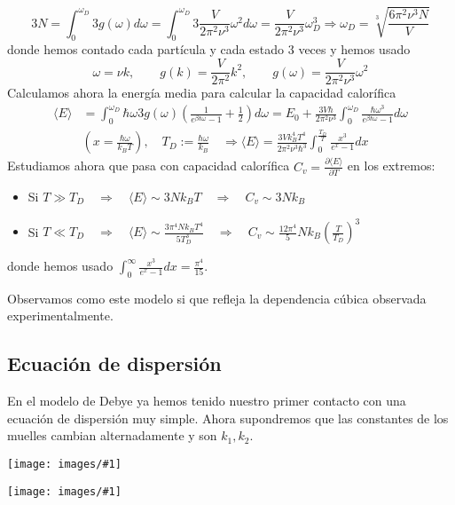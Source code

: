 \documentclass[leqno]{article}
\newcommand{\incimg}[1]{%
\center
\texttt{[image: images/\#1]}
}
\begin{document}
\[
  3N = \int_0^{\omega _D} 3g(\omega )d\omega =\int_0^{\omega _D}3 \frac{V}{2\pi^2\nu^3}\omega ^2 d\omega = \frac{V}{2\pi^2 \nu^3}\omega _D^3 \Rightarrow \boxed{\omega _D = \sqrt[3]{\frac{6\pi^2\nu^3N}{V}} }
\] 
donde hemos contado cada partícula y cada estado 3 veces y hemos usado
\[
\omega = \nu k, \qquad g(k)=\frac{V}{2\pi^2}k^2, \qquad g(\omega )= \frac{V}{2\pi^2 \nu^3}\omega ^2
\]
Calculamos ahora la energía media para calcular la capacidad calorífica
\begin{align*}
  \langle E \rangle &= \int_0^{\omega _D}\hbar \omega 3g(\omega )\left( \frac{1}{e^{\beta \hbar \omega }-1} +\frac{1}{2} \right) d\omega  = E_0 + \frac{3V\hbar }{2\pi^2\nu^3} \int_0^{\omega _D}\frac{\hbar \omega ^3}{e^{\beta \hbar \omega }-1} d\omega \\
	   & (x=\frac{\hbar \omega }{k_B T}), \quad T_D := \frac{\hbar \omega }{k_B} \quad   \Rightarrow  \boxed{\langle E \rangle = \frac{3Vk_B^4T^4}{2\pi^2\nu^3\hbar ^3}\int_0^{\frac{T_D}{T}}\frac{x^3}{e^x-1}dx }
\end{align*}
Estudiamos ahora que pasa con capacidad calorífica $C_v = \frac{\partial \langle E \rangle }{\partial T}$ en los extremos:
\begin{itemize}[topsep=-6pt, itemsep=0pt]
  \item Si $T\gg T_D \quad \Rightarrow \quad \langle E \rangle \sim 3Nk_BT \quad \Rightarrow \quad C_v \sim  3Nk_B $
  \item Si $T\ll T_D \quad \Rightarrow \quad \langle E \rangle \sim  \frac{3\pi^4Nk_BT^4}{5T_D^3}\quad\Rightarrow \quad C_v \sim  \frac{12\pi^4}{5}Nk_B \left( \frac{T}{T_D} \right)^3 $
\end{itemize}
donde hemos usado $\int_0^\infty \frac{x^3}{e^x-1}dx=\frac{\pi^4}{15}$.

Observamos como este modelo si que refleja la dependencia cúbica observada experimentalmente.

\subsection{Ecuación de dispersión}
En el modelo de Debye ya hemos tenido nuestro primer contacto con una ecuación de dispersión muy simple. Ahora supondremos que las constantes de los muelles cambian alternadamente y son $k_1, k_2$.

\begin{minipage}{0.49\textwidth}
\incimg{prob2_3chain.png}
\end{minipage}
\begin{minipage}{0.49\textwidth}
\incimg{prob2_3.png}
\end{minipage}
\end{document}

